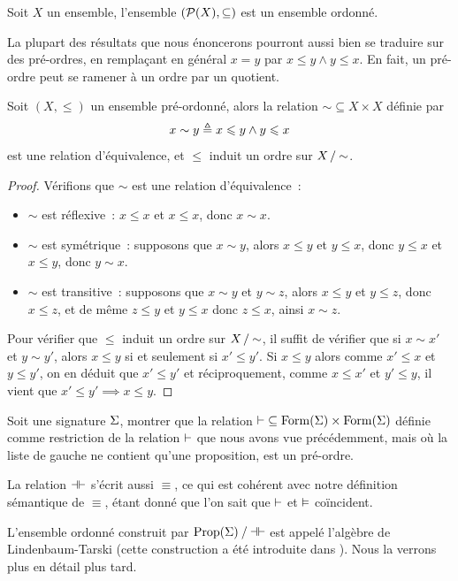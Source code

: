 \begin{example}
  Soit $X$ un ensemble, l'ensemble $(\mathcal{P}(X),\subseteq)$ est un ensemble
  ordonné.
\end{example}

La plupart des résultats que nous énoncerons pourront aussi bien se traduire sur
des pré-ordres, en remplaçant en général $x = y$ par $x\leq y \land y \leq x$.
En fait, un pré-ordre peut se ramener à un ordre par un quotient.

\begin{property}
  Soit $(X,\leq)$ un ensemble pré-ordonné, alors la relation
  $\mathord{\sim}\subseteq X \times X$ définie par
  \[x\sim y \triangleq x\leqslant y \land y \leqslant x\]
  est une relation d'équivalence, et $\leq$ induit un ordre sur
  $\mathord{X}\mathbin{/}\mathord{\sim}$.
\end{property}

\begin{proof}
  Vérifions que $\sim$ est une relation d'équivalence~:
  \begin{itemize}
  \item $\sim$ est réflexive~:
    $x\leq x$ et $x\leq x$, donc $x\sim x$.
  \item $\sim$ est symétrique~:
    supposons que $x\sim y$, alors $x\leq y$ et
    $y\leq x$, donc $y\leq x$ et $x\leq y$, donc $y\sim x$.
  \item $\sim$ est transitive~:
    supposons que $x\sim y$ et $y\sim z$, alors
    $x\leq y$ et $y\leq z$, donc $x\leq z$, et de même $z\leq y$ et $y\leq x$
    donc $z\leq x$, ainsi $x\sim z$.
  \end{itemize}

  Pour vérifier que $\leq$ induit un ordre sur $\mathord{X}\mathbin{/}\mathord{\sim}$,
  il suffit de vérifier
  que si $x\sim x'$ et $y\sim y'$, alors $x\leq y$ si et seulement si
  $x'\leq y'$.
  Si $x\leq y$ alors comme $x'\leq x$ et $y\leq y'$, on en déduit que
  $x'\leq y'$
  et réciproquement, comme $x\leq x'$ et $y'\leq y$, il vient que
  $x'\leq y'\implies x\leq y$.
\end{proof}

\begin{exercise}
  Soit une signature $\Sigma$, montrer que la relation
  $\mathord{\vdash}\subseteq\operatorname{Form}(\Sigma)\times\operatorname{Form}(\Sigma)$ définie comme
  restriction de la relation $\vdash$ que nous avons vue précédemment, mais où
  la liste de gauche ne contient qu'une proposition, est un pré-ordre.
\end{exercise}

\begin{remark}
  La relation $\mathrel{\mathord{\dashv}\mathord{\vdash}}$ s'écrit aussi $\equiv$, ce qui est cohérent avec
  notre définition sémantique de $\equiv$, étant donné que l'on sait que
  $\vdash$ et $\vDash$ coïncident.

  L'ensemble ordonné construit par $\mathord{\operatorname{Prop}(\Sigma)}\mathbin{/}\mathord{\mathrel{\mathord{\dashv}\mathord{\vdash}}}$ est appelé
  l'algèbre de Lindenbaum-Tarski (cette construction a été
  introduite dans \cite{Tarski1956}). Nous la verrons plus en détail plus
  tard.
\end{remark}


